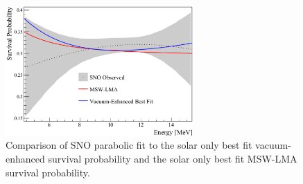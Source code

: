 \begin{figure}[htbp]
  \centering
  \includegraphics[width=0.64\textwidth]{sno_solar_only_bf}
  \caption[SNO Fit Comparison for Solar Only Best Fit Vacuum-Enhanced Mixing and MSW-LMA Mixing]{
  Comparison of SNO parabolic fit to the solar only best fit vacuum-enhanced survival probability
and the solar only best fit MSW-LMA survival probability.}
  \label{fig:solar_only_sno}
\end{figure}

